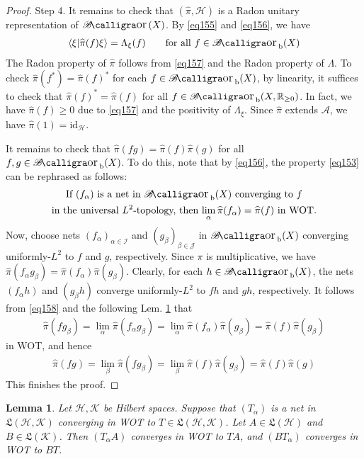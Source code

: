 \documentclass[12pt,b5paper,notitlepage]{article}
\theoremstyle{definition}
\theoremstyle{plain}
\newtheorem{lm}[df]{Lemma}
\DeclareMathOperator{\Bor}{\mathscr{B}\text{\kern -2pt {\calligra\large or}}\,}
\DeclareMathOperator{\Borb}{{\mathscr{B}\text{\kern -2pt {\calligra\large or}}\,}_{\mathrm b}}
\newcommand{\fk}{\mathfrak}
\newcommand{\wht}{\widehat}
\newcommand{\id}{\mathrm{id}}
\newcommand{\bk}[1]{\langle {#1}\rangle}
\newcommand{\scr}{\mathscr}
\newcommand{\Rbb}{\mathbb R}
\newcommand{\MH}{\mathcal H}
\newcommand{\MK}{\mathcal K}
\numberwithin{equation}{section}
\begin{document}
\begin{proof}
Step 4. It remains to check that $(\wht\pi,\MH)$ is a Radon unitary representation of $\Bor(X)$. By \eqref{eq155} and \eqref{eq156}, we have
\begin{align}\label{eq157}
\bk{\xi|\wht\pi(f)\xi}=\Lambda_\xi(f)\qquad\text{for all }f\in\Borb(X)
\end{align}
The Radon property of $\wht\pi$ follows from \eqref{eq157} and the Radon property of $\Lambda$. To check $\wht\pi(f^*)=\wht\pi(f)^*$ for each $f\in\Borb(X)$, by linearity, it suffices to check that $\wht\pi(f)^*=\wht\pi(f)$ for all $f\in\Borb(X,\Rbb_{\geq0})$. In fact, we have $\wht\pi(f)\geq0$ due to \eqref{eq157} and the positivity of $\Lambda_\xi$. Since $\wht\pi$ extends $\scr A$, we have $\wht\pi(1)=\id_\MH$.

It remains to check that $\wht\pi(fg)=\wht\pi(f)\wht\pi(g)$ for all $f,g\in\Borb(X)$. To do this, note that by \eqref{eq156}, the property \eqref{eq153} can be rephrased as follows:
\begin{gather}\label{eq158}
\begin{gathered}
\text{If $(f_\alpha)$ is a net in $\Borb(X)$ converging to $f$}\\
\text{in the universal $L^2$-topology, then $\lim_\alpha\wht\pi(f_\alpha)=\wht\pi(f)$ in WOT.}
\end{gathered}
\end{gather}
Now, choose nets $(f_\alpha)_{\alpha\in\scr I}$ and $(g_\beta)_{\beta\in\scr J}$ in $\Borb(X)$ converging uniformly-$L^2$ to $f$ and $g$, respectively. Since $\pi$ is multiplicative, we have $\wht\pi(f_\alpha g_\beta)=\wht\pi(f_\alpha)\wht\pi(g_\beta)$. Clearly, for each $h\in\Borb(X)$, the nets $(f_\alpha h)$ and $(g_\beta h)$ converge uniformly-$L^2$ to $fh$ and $gh$, respectively. It follows from \eqref{eq158} and the following Lem. \ref{lb279} that
\begin{align*}
\wht\pi(fg_\beta)=\lim_\alpha \wht\pi(f_\alpha g_\beta)=\lim_\alpha\wht\pi(f_\alpha)\wht\pi(g_\beta)=\wht\pi(f)\wht\pi(g_\beta)
\end{align*}
in WOT, and hence
\begin{align*}
\wht\pi(fg)=\lim_\beta\wht\pi(fg_\beta)=\lim_\beta\wht\pi(f)\wht\pi(g_\beta)=\wht\pi(f)\wht\pi(g)
\end{align*}
This finishes the proof.
\end{proof}


\begin{lm}\label{lb279}
Let $\MH,\MK$ be Hilbert spaces. Suppose that $(T_\alpha)$ is a net in $\fk L(\MH,\MK)$ converging in WOT to $T\in\fk L(\MH,\MK)$. Let $A\in\fk L(\MH)$ and $B\in\fk L(\MK)$. Then $(T_\alpha A)$ converges in WOT to $TA$, and $(BT_\alpha)$ converges in WOT to $BT$.
\end{lm}
\end{document}
